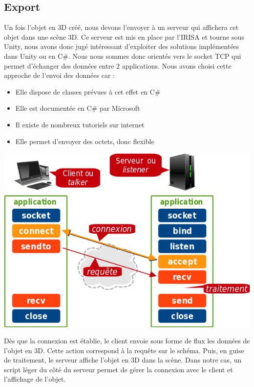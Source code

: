 \documentclass[a4paper,11pt]{article}
\begin{document}
		\subsection{Export} %
			Un fois l'objet en 3D créé, nous devons l'envoyer à un serveur qui affichera cet objet dans une scène 3D.
			Ce serveur est mis en place par l'IRISA et tourne sous Unity, nous avons donc jugé intéressant d'exploiter des solutions implémentées dans Unity ou en C\#.
			Nous nous sommes donc orientés vers le socket TCP qui permet d'échanger des données entre 2 applications.
			Nous avons choisi cette approche de l'envoi des données car :
			\begin{itemize}
				\item Elle dispose de classes prévues à cet effet en C\#
				\item Elle est documentée en C\# par Microsoft\cite{MSDN} 
				\item Il existe de nombreux tutoriels sur internet\cite{CodeProject}
				\item Elle permet d'envoyer des octets, donc flexible
			\end{itemize}
						
			
			\centerline{\includegraphics[scale=1]{images/tcp-socket.png}}
			
			Dès que la connexion est établie, le client envoie sous forme de flux les données de l'objet en 3D. Cette action correspond à la requête sur le schéma. Puis, en guise de traitement, le serveur affiche l'objet en 3D dans la scène.
			Dans notre cas, un script léger du côté du serveur permet de gérer la connexion avec le client et l'affichage de l'objet.
			
\end{document}
